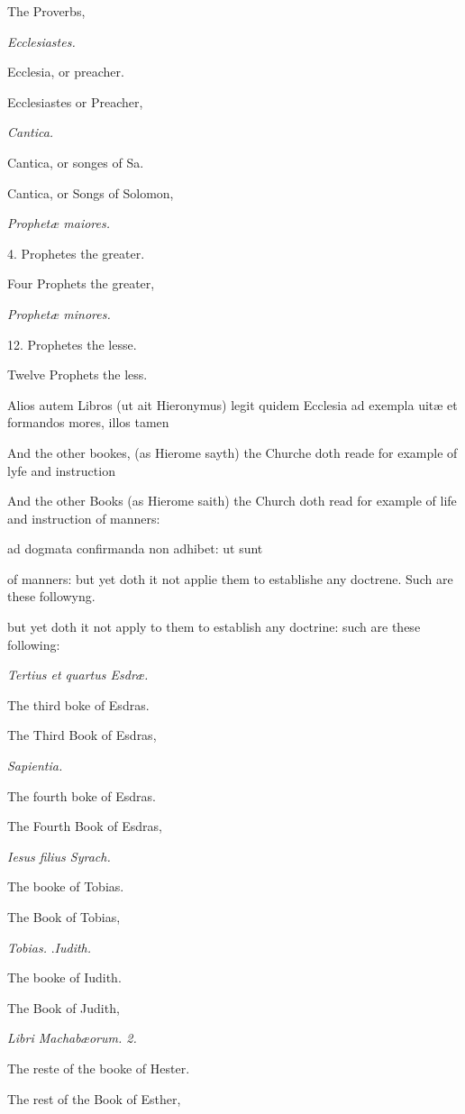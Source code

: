The Proverbs,

\emph{Ecclesiastes.}

Ecclesia, or preacher.

Ecclesiastes or Preacher,

\emph{Cantica.}

Cantica, or songes of Sa.

Cantica, or Songs of Solomon,

\emph{Prophetæ maiores.}

4. Prophetes the greater.

Four Prophets the greater,

\emph{Prophetæ minores.}

12. Prophetes the lesse.

Twelve Prophets the less.

Alios autem Libros (ut ait Hieronymus) legit quidem Ecclesia ad exempla uitæ et formandos mores, illos tamen

And the other bookes, (as Hierome sayth) the Churche doth reade for example of lyfe and instruction

And the other Books (as Hierome saith) the Church doth read for example of life and instruction of manners:

ad dogmata confirmanda non adhibet: ut sunt

of manners: but yet doth it not applie them to establishe any doctrene. Such are these followyng.

but yet doth it not apply to them to establish any doctrine: such are these following:

\emph{Tertius et quartus Esdræ.}

The third boke of Esdras.

The Third Book of Esdras,

\emph{Sapientia.}

The fourth boke of Esdras.

The Fourth Book of Esdras,

\emph{Iesus filius Syrach.}

The booke of Tobias.

The Book of Tobias,

\emph{Tobias.} .\emph{Iudith.}

The booke of Iudith.

The Book of Judith,

\emph{Libri Machabæorum. 2.}

The reste of the booke of Hester.

The rest of the Book of Esther,

